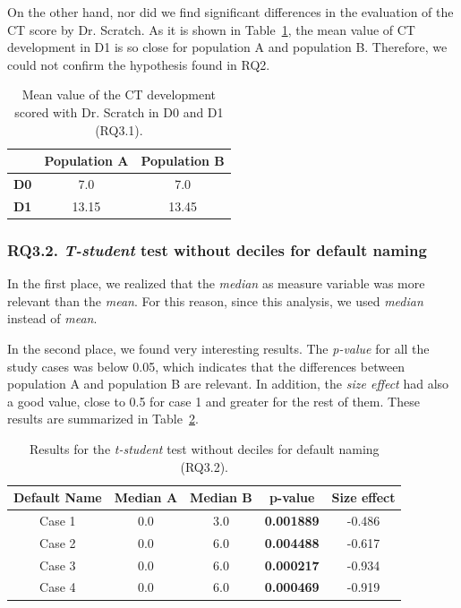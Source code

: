 On the other hand, nor did we find significant differences in the evaluation of the CT score by Dr. Scratch. As it is shown in Table~\ref{table:rq3_1_statistical_results_mean}, the mean value of CT development in D1 is so close for population A and population B. Therefore, we could not confirm the hypothesis found in RQ2. 

\begin{table}
 \begin{center}
  \begin{tabular}{|c|c|c|}
    \hline
     & \textbf{Population A} & \textbf{Population B} \\ \hline
    \textbf{D0} & 7.0 & 7.0 \\ \hline
    \textbf{D1} & 13.15 & 13.45 \\ \hline
  \end{tabular}
  \caption{Mean value of the CT development scored with Dr. Scratch in D0 and D1 (RQ3.1).}
  \label{table:rq3_1_statistical_results_mean}
 \end{center}
\end{table}



\subsubsection{RQ3.2. \textit{T-student} test without deciles for default naming}
\label{subsubsec:RQ3_2_statistical_results}

In the first place, we realized that the \textit{median} as measure variable was more relevant than the \textit{mean}. For this reason, since this analysis, we used \textit{median} instead of \textit{mean}. 

In the second place, we found very interesting results. The \textit{p-value} for all the study cases was below 0.05, which indicates that the differences between population A and population B are relevant. In addition, the \textit{size effect} had also a good value, close to 0.5 for case 1 and greater for the rest of them. These results are summarized in Table~\ref{table:rq3_2_statistical_results}. 

\begin{table}
 \begin{center}
  \begin{tabular}{|c|c|c|c|c|}
    \hline
    \textbf{Default Name} & \textbf{Median A} & \textbf{Median B} & \textbf{p-value} & \textbf{Size effect} \\ \hline
    Case 1 & 0.0 & 3.0 & \textbf{0.001889} & -0.486 \\ \hline
    Case 2 & 0.0 & 6.0 & \textbf{0.004488} & -0.617 \\ \hline
    Case 3 & 0.0 & 6.0 & \textbf{0.000217} & -0.934 \\ \hline
    Case 4 & 0.0 & 6.0 & \textbf{0.000469} & -0.919 \\ \hline
  \end{tabular}
  \caption{Results for the \textit{t-student} test without deciles for default naming (RQ3.2).}
  \label{table:rq3_2_statistical_results}
 \end{center}
\end{table}


